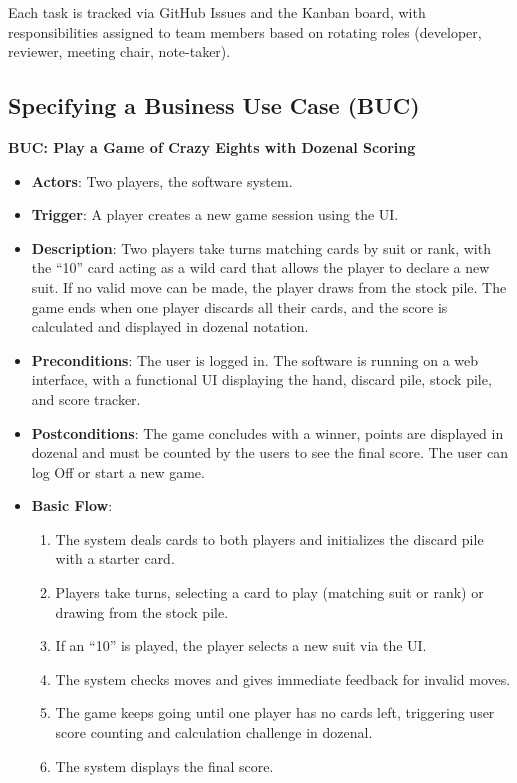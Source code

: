 \documentclass[12pt]{article}
\begin{document}
Each task is tracked via GitHub Issues and the Kanban board, with responsibilities assigned to team members based on rotating roles (developer, reviewer, meeting chair, note-taker).

\subsection{Specifying a Business Use Case (BUC)}

\textbf{BUC: Play a Game of Crazy Eights with Dozenal Scoring}

\begin{itemize}
    \item \textbf{Actors}: Two players, the software system.
    \item \textbf{Trigger}: A player creates a new game session using the UI.
    \item \textbf{Description}: Two players take turns matching cards by suit or rank, with the ``10'' card acting as a wild card that allows the player to declare a new suit. If no valid move can be made, the player draws from the stock pile. The game ends when one player discards all their cards, and the score is calculated and displayed in dozenal notation.
    \item \textbf{Preconditions}: The user is logged in. The software is running on a web interface, with a functional UI displaying the hand, discard pile, stock pile, and score tracker.
    \item \textbf{Postconditions}: The game concludes with a winner, points are displayed in dozenal and must be counted by the users to see the final score. The user can log Off or start a new game.
    \item \textbf{Basic Flow}:
    \begin{enumerate}
        \item The system deals cards to both players and initializes the discard pile with a starter card.
        \item Players take turns, selecting a card to play (matching suit or rank) or drawing from the stock pile.
        \item If an ``10'' is played, the player selects a new suit via the UI.
        \item The system checks moves and gives immediate feedback for invalid moves.
        \item The game keeps going until one player has no cards left, triggering user score counting and calculation challenge in dozenal.
        \item The system displays the final score.

\end{enumerate}
\end{itemize}
\end{document}
